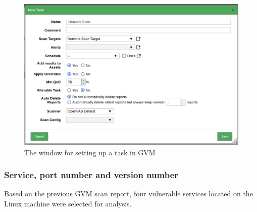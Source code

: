 \begin{figure}[H]
    \caption{The window for setting up a task in GVM}
    \begin{center}
        \includegraphics[width=\textwidth]{Outputs/E03/gvm-task.png}
    \end{center}
\end{figure}
\subsubsection{Service, port number and version number}
Based on the previous GVM scan report, four vulnerable services located on the Linux machine were selected for analysis.


